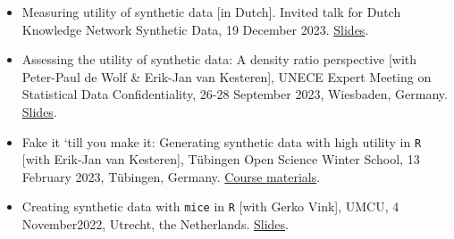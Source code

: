 \documentclass[11pt,a4paper,roman,colorlinks,linkcolor = blue]{moderncv}        %
\begin{document}
\begin{itemize}
\item[$\circ$] Measuring utility of synthetic data [in Dutch]. Invited talk for Dutch Knowledge Network Synthetic Data, 19 December 2023. \href{https://thomvolker.github.io/utiliteit/}{Slides}.
\item[$\circ$] Assessing the utility of synthetic data: A density ratio perspective [with Peter-Paul de Wolf \& Erik-Jan van Kesteren], UNECE Expert Meeting on Statistical Data Confidentiality, 26-28 September 2023, Wiesbaden, Germany. \href{https://github.com/thomvolker/unece-density-ratio/tree/main/presentation}{Slides}.
\item[$\circ$] Fake it ‘till you make it: Generating synthetic data with high utility in \texttt{R} [with Erik-Jan van Kesteren], T{\"u}bingen Open Science Winter School, 13 February 2023, T{\"u}bingen, Germany. \href{https://thomvolker.github.io/OSWS_Synthetic/}{Course materials}.
\item[$\circ$] Creating synthetic data with \texttt{mice} in \texttt{R} [with Gerko Vink], UMCU, 4 November2022, Utrecht, the Netherlands. \href{https://www.gerkovink.com/syn/}{Slides}.
\end{itemize}


\end{document}
